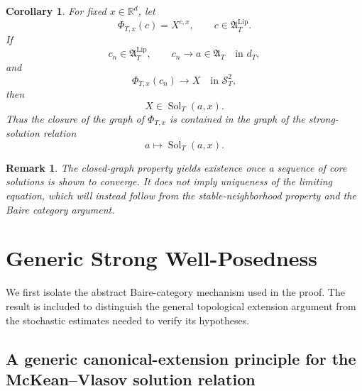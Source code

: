 \documentclass[12pt,oneside, reqno]{amsart}
\newtheorem{remark}[theorem]{Remark}
\newtheorem{corollary}[theorem]{Corollary}
\numberwithin{equation}{section}
\begin{document}
	\begin{corollary}
		\label{cor:closed-core-solution-map}
		For fixed $x\in\mathbb R^d$, let
		\[
		\Phi_{T,x}(c)=X^{c,x},
		\qquad
		c\in\mathfrak A_T^{\mathrm{Lip}}.
		\]
		If
		\[
		c_n\in\mathfrak A_T^{\mathrm{Lip}},
		\qquad
		c_n\longrightarrow a\in\mathfrak A_T
		\quad\text{in }d_T,
		\]
		and
		\[
		\Phi_{T,x}(c_n)\longrightarrow X
		\quad\text{in }\mathcal S_T^2,
		\]
		then
		\[
		X\in\operatorname{Sol}_T(a,x).
		\]
		Thus the closure of the graph of $\Phi_{T,x}$ is contained in the
		graph of the strong-solution relation
		\[
		a\longmapsto\operatorname{Sol}_T(a,x).
		\]
	\end{corollary}
	
	\begin{remark}
		The closed-graph property yields existence once a sequence of core
		solutions is shown to converge. It does not imply uniqueness of the
		limiting equation, which will instead follow from the
		stable-neighborhood property and the Baire category argument.
	\end{remark}
	
	
	
	
	
	
	
	
	
	
	
	
	
	
	
	
	
	
	
	\section{Generic Strong Well-Posedness}
	\label{sec:generic-strong-wellposedness}
	
	We first isolate the abstract Baire-category mechanism used in the
	proof. The result is included to distinguish the general topological
	extension argument from the stochastic estimates needed to verify its
	hypotheses.
	
	\subsection{A generic canonical-extension principle for the McKean--Vlasov solution relation}
	
\end{document}
